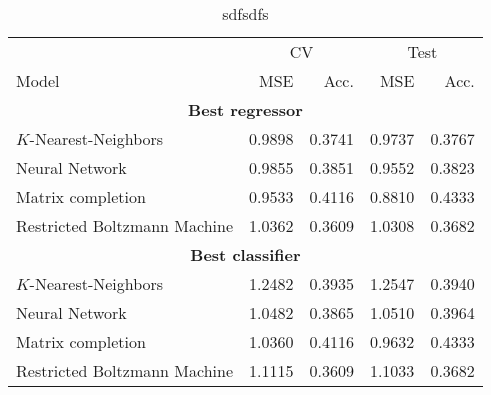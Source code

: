 \begin{table}
\centering
\caption{sdfsdfs}
\label{tab:results.model}
\begin{tabular}{lrrrr}
\toprule
	      &  \multicolumn{2}{c}{CV} & \multicolumn{2}{c}{Test} \\
           \cmidrule(lr){2-3}\cmidrule(lr){4-5}
Model	 &  MSE & Acc. & MSE & Acc.  \\
\midrule
\multicolumn{5}{c}{\textbf{Best regressor}}\\
$K$-Nearest-Neighbors 					&   0.9898 &      0.3741 &   0.9737 &        0.3767 \\
Neural Network 							&   0.9855 &      0.3851 &   0.9552 &        0.3823 \\
Matrix completion 						&   0.9533 &      0.4116 &   0.8810 &        0.4333 \\
Restricted Boltzmann Machine 			&   1.0362 &      0.3609 &   1.0308 &        0.3682 \\
\midrule
\multicolumn{5}{c}{\textbf{Best classifier}}\\
$K$-Nearest-Neighbors 					&   1.2482 &      0.3935 &   1.2547 &        0.3940 \\
Neural Network 							&   1.0482 &      0.3865 &   1.0510 &        0.3964 \\
Matrix completion 						&   1.0360 &      0.4116 &   0.9632 &        0.4333 \\
Restricted Boltzmann Machine 			&   1.1115 &      0.3609 &   1.1033 &        0.3682 \\
\bottomrule
\end{tabular}
\end{table}

